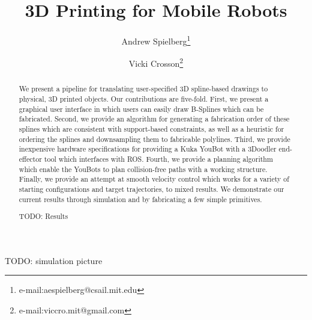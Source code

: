\documentclass[conference]{acmsiggraph}
\title{3D Printing for Mobile Robots}
\author{Andrew Spielberg\thanks{e-mail:aespielberg@csail.mit.edu} \and Vicki Crosson\thanks{e-mail:viccro.mit@gmail.com}}
\begin{document}
 


\maketitle

 TODO: simulation picture

\begin{abstract}
We present a pipeline for translating user-specified 3D spline-based drawings to physical, 3D printed objects.  Our contributions are five-fold.  First, we present a graphical user interface in which users can easily draw B-Splines which can be fabricated.  Second, we provide an algorithm for generating a fabrication order of these splines which are consistent with support-based constraints, as well as a heuristic for ordering the splines and downsampling them to fabricable polylines.  Third, we provide inexpensive hardware specifications for providing a Kuka YouBot with a 3Doodler end-effector tool which interfaces with ROS.  Fourth, we provide a planning algorithm which enable the YouBots to plan collision-free paths with a working structure.  Finally, we provide an attempt at smooth velocity control which works for a variety of starting configurations and target trajectories, to mixed results.  We demonstrate our current results through simulation and by fabricating a few simple primitives.

TODO: Results




\end{abstract}

\end{document}
